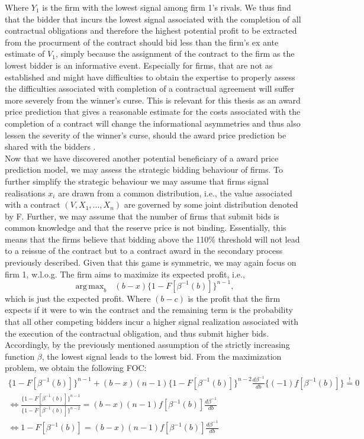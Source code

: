 \documentclass[a4paper,12pt, headsepline]{scrartcl}
\DeclareMathOperator*{\argmaxA}{arg\,max}
\numberwithin{equation}{section}
\begin{document}
Where $Y_1$ is the firm with the lowest signal among firm 1's rivals. We thus find that the bidder that incurs the lowest signal associated with the completion of all contractual obligations and therefore the highest potential profit to be extracted from the procurment of the contract should bid less than the firm's ex ante estimate of $V_1$, simply because the assignment of the contract to the firm as the lowest bidder is an informative event. Especially for firms, that are not as established and might have difficulties to obtain the expertise to properly assess the difficulties associated with completion of a contractual agreement will suffer more severely from the winner's curse. This is relevant for this thesis as an award price prediction that gives a reasonable estimate for the costs associated with the completion of a contract will change the informational asymmetries and thus also lessen the severity of the winner's curse, should the award price prediction be shared with the bidders \citep{GarciaRodriguez2020}.\\
Now that we have discovered another potential beneficiary of a award price prediction model, we may assess the strategic bidding behaviour of firms. To further simplify the strategic behaviour we may assume that firms signal realisations $x_i$ are drawn from a common distribution, i.e., the value associated with a contract $(V, X_1, ..., X_n)$ are governed by some joint distribution denoted by F. Further, we may assume that the number of firms that submit bids is common knowledge and that the reserve price is not binding. Essentially, this means that the firms believe that bidding above the 110\% threshold will not lead to a reissue of the contract but to a contract award in the secondary process previously described. Given that this game is symmetric, we may again focus on firm 1, w.l.o.g. The firm aims to maximize its expected profit, i.e.,
\[
\argmaxA_b \text{ } (b - x)\{1 - F[\beta^{-1}(b)]\}^{n-1},
\]
which is just the expected profit. Where $(b - c)$ is the profit that the firm expects if it were to win the contract and the remaining term is the probability that all other competing bidders incur a higher signal realization associated with the execution of the contractual obligation, and thus submit higher bids. Accordingly, by the previously mentioned assumption of the strictly increasing function $\beta$, the lowest signal leads to the lowest bid. From the maximization problem, we obtain the following FOC:
\begin{gather*}
\{1-F[\beta^{-1}(b)]\}^{n-1} + (b - x)(n - 		1)\{1-F[\beta^{-1}(b)]\}^{n-2}\frac{d\beta^{-1}}{db}\{(-1)f[\beta^{-1}(b)]\} \overset{!}{=} 0\\
	\iff \frac{\{1-F[\beta^{-1}(b)]\}^{n-1}}{\{1-F[\beta^{-1}(b)]\}^{n-2}} = (b - x)(n - 1)f[\beta^{-1}(b)]\frac{d\beta^{-1}}{db}\\
	\iff 1-F[\beta^{-1}(b)] = (b - x)(n - 1)f[\beta^{-1}(b)]\frac{d\beta^{-1}}{db}
\end{gather*}
\end{document}
